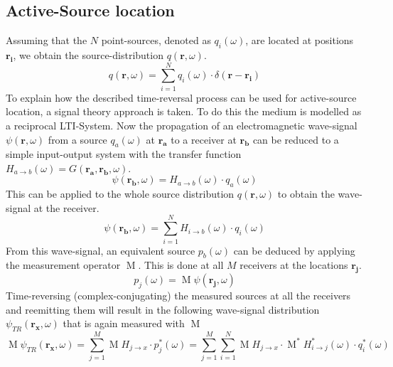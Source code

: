 \subsection{Active-Source location}
Assuming that the \(N\) point-sources, denoted as \(q_i(\omega)\), are located at positions \(\mathbf{r_i}\), we obtain the source-distribution \(q(\mathbf{r}, \omega)\).
\begin{equation}
    q(\mathbf{r}, \omega) = \sum_{i=1}^{N} q_i(\omega) \cdot \delta(\mathbf{r} - \mathbf{r_i})
\end{equation}
To explain how the described time-reversal process can be used for active-source location, a signal theory approach is taken.
To do this the medium is modelled as a reciprocal LTI-System.
Now the propagation of an electromagnetic wave-signal \(\psi(\mathbf{r}, \omega )\) from a source \(q_a(\omega )\) at \(\mathbf{r_a}\) to a receiver at \(\mathbf{r_b}\) can be reduced to a simple input-output system with the transfer function \(H_{a\rightarrow b}(\omega) = G(\mathbf{r_a}, \mathbf{r_b}, \omega)\).
\begin{equation}
    \psi(\mathbf{r_b}, \omega) = H_{a\rightarrow b}(\omega) \cdot q_a(\omega)
\end{equation}
This can be applied to the whole source distribution \(q(\mathbf{r}, \omega)\) to obtain the wave-signal at the receiver.
\begin{equation}
    \psi(\mathbf{r_b}, \omega) = \sum_{i=1}^{N} H_{i\rightarrow b}(\omega) \cdot q_i(\omega)
\end{equation}
From this wave-signal, an equivalent source \(p_b(\omega)\) can be deduced by applying the measurement operator \(\operatorname{M}\). This is done at all \(M\) receivers at the locations \(\mathbf{r_j}\).  
\begin{equation}
    p_j(\omega) = \operatorname{M} \psi(\mathbf{r_j}, \omega)
\end{equation}
Time-reversing (complex-conjugating) the measured sources at all the receivers and reemitting them will result in the following wave-signal distribution \(\psi_{TR}(\mathbf{r_x}, \omega)\) that is again measured with \(\operatorname{M}\)
\begin{equation}\label{signal-time-reversal}
    \operatorname{M} \psi_{TR}(\mathbf{r_x}, \omega) = \sum_{j=1}^{M} \operatorname{M} H_{j\rightarrow x} \cdot p_j^*(\omega) = \sum_{j=1}^{M} \sum_{i=1}^{N} \operatorname{M} H_{j\rightarrow x} \cdot \operatorname{M}^* H^*_{i\rightarrow j}(\omega) \cdot q^*_i(\omega)
\end{equation}
